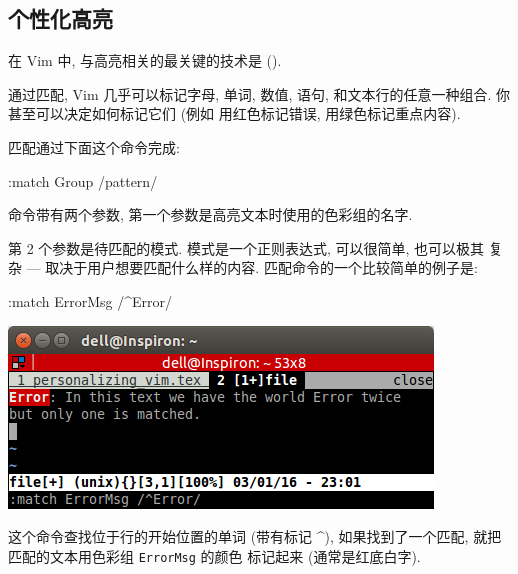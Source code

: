 \begin{warning}
\section{个性化高亮}
\label{sec:personal_highlighting}
在 Vim 中, 与高亮相关的最关键的技术是  ().

通过匹配, Vim 几乎可以标记字母, 单词, 数值, 语句, 和文本行的任意一种组合.
你甚至可以决定如何标记它们 (例如 用红色标记错误, 用绿色标记重点内容).

匹配通过下面这个命令完成:
\begin{vimcmd}
:match Group /pattern/
\end{vimcmd}
命令带有两个参数, 第一个参数是高亮文本时使用的色彩组的名字.
第 2 个参数是待匹配的模式. 模式是一个正则表达式, 可以很简单, 也可以极其
复杂 --- 取决于用户想要匹配什么样的内容. 匹配命令的一个比较简单的例子是:
\begin{vimcmd}
:match ErrorMsg /^Error/
\end{vimcmd}
\includegraphics[scale=0.7]{./images/page23.png}

这个命令查找位于行的开始位置的单词  (带有标记 \textsf{\^}),
如果找到了一个匹配, 就把匹配的文本用色彩组 \texttt{ErrorMsg} 的颜色
标记起来 (通常是红底白字).


\end{warning}
